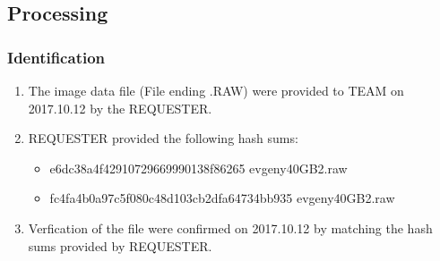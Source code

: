 \subsection{Processing}
\subsubsection{Identification}
\begin{enumerate}
	\item The image data file (File ending .RAW) were provided to TEAM on 2017.10.12 by the REQUESTER.
	\item REQUESTER provided the following hash sums:
		\begin{itemize}
			\item e6dc38a4f42910729669990138f86265  evgeny\textunderscore 40GB\textunderscore2.raw
			\item fc4fa4b0a97c5f080c48d103cb2dfa64734bb935 evgeny\textunderscore 40GB\textunderscore2.raw
		\end{itemize}
	\item Verfication of the file were confirmed on 2017.10.12 by matching the hash sums provided by REQUESTER.
\end{enumerate}
